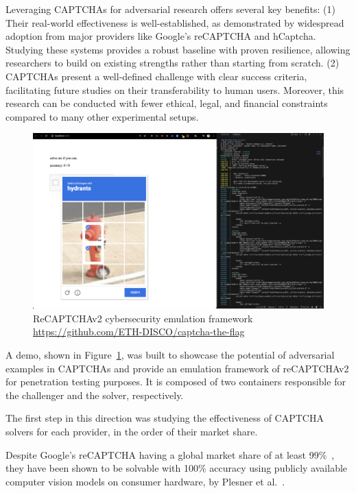 \documentclass[a4paper, oneside]{discothesis}
\begin{document}
Leveraging CAPTCHAs for adversarial research offers several key benefits: (1) Their real-world effectiveness is well-established, as demonstrated by widespread adoption from major providers like Google's reCAPTCHA and hCaptcha. Studying these systems provides a robust baseline with proven resilience, allowing researchers to build on existing strengths rather than starting from scratch. (2) CAPTCHAs present a well-defined challenge with clear success criteria, facilitating future studies on their transferability to human users. Moreover, this research can be conducted with fewer ethical, legal, and financial constraints compared to many other experimental setups.

\begin{figure}
	\centering
	\includegraphics[width=1\columnwidth]{figures/ctf.png}
	\caption{ReCAPTCHAv2 cybersecurity emulation framework \\ \url{https://github.com/ETH-DISCO/captcha-the-flag}}
	\label{fig:ctf}
\end{figure}

A demo, shown in Figure~\ref{fig:ctf}, was built to showcase the potential of adversarial examples in CAPTCHAs and provide an emulation framework of reCAPTCHAv2 for penetration testing purposes. It is composed of two containers responsible for the challenger and the solver, respectively.

The first step in this direction was studying the effectiveness of CAPTCHA solvers for each provider, in the order of their market share.

Despite Google's reCAPTCHA having a global market share of at least 99\%~\cite{authkong2024recaptcha}, they have been shown to be solvable with 100\% accuracy using publicly available computer vision models on consumer hardware, by Plesner et al.~\cite{plesner2024breaking}.
\end{document}
